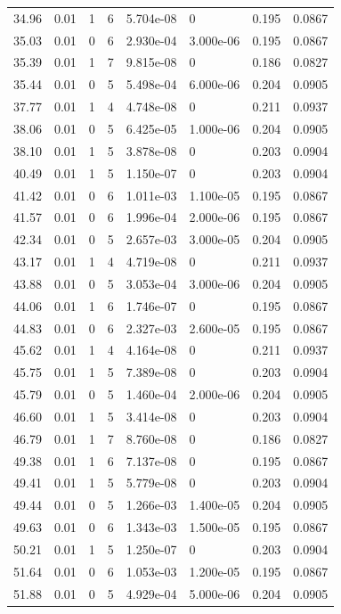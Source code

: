\documentclass[preview]{standalone}
\begin{document}
{{{\begin{tabular}{L{1.2cm}C{1.2cm} C{0.3cm}C{0.5cm} C{1.4cm}C{1.4cm} C{1.4cm}C{1.4cm}}
  34.96  &  0.01  & 1     &  6 &  5.704e-08  & 0  & 0.195 &  0.0867   \\ 
  35.03  &  0.01  & 0     &  6 &  2.930e-04  & 3.000e-06  & 0.195 &  0.0867   \\ 
  35.39  &  0.01  & 1     &  7 &  9.815e-08  & 0  & 0.186 &  0.0827   \\ 
  35.44  &  0.01  & 0     &  5 &  5.498e-04  & 6.000e-06  & 0.204 &  0.0905   \\ 
  37.77  &  0.01  & 1     &  4 &  4.748e-08  & 0  & 0.211 &  0.0937   \\ 
  38.06  &  0.01  & 0     &  5 &  6.425e-05  & 1.000e-06  & 0.204 &  0.0905   \\ 
  38.10  &  0.01  & 1     &  5 &  3.878e-08  & 0  & 0.203 &  0.0904   \\ 
  40.49  &  0.01  & 1     &  5 &  1.150e-07  & 0  & 0.203 &  0.0904   \\ 
  41.42  &  0.01  & 0     &  6 &  1.011e-03  & 1.100e-05  & 0.195 &  0.0867   \\ 
  41.57  &  0.01  & 0     &  6 &  1.996e-04  & 2.000e-06  & 0.195 &  0.0867   \\ 
  42.34  &  0.01  & 0     &  5 &  2.657e-03  & 3.000e-05  & 0.204 &  0.0905   \\ 
  43.17  &  0.01  & 1     &  4 &  4.719e-08  & 0  & 0.211 &  0.0937   \\ 
  43.88  &  0.01  & 0     &  5 &  3.053e-04  & 3.000e-06  & 0.204 &  0.0905   \\ 
  44.06  &  0.01  & 1     &  6 &  1.746e-07  & 0  & 0.195 &  0.0867   \\ 
  44.83  &  0.01  & 0     &  6 &  2.327e-03  & 2.600e-05  & 0.195 &  0.0867   \\ 
  45.62  &  0.01  & 1     &  4 &  4.164e-08  & 0  & 0.211 &  0.0937   \\ 
  45.75  &  0.01  & 1     &  5 &  7.389e-08  & 0  & 0.203 &  0.0904   \\ 
  45.79  &  0.01  & 0     &  5 &  1.460e-04  & 2.000e-06  & 0.204 &  0.0905   \\ 
  46.60  &  0.01  & 1     &  5 &  3.414e-08  & 0  & 0.203 &  0.0904   \\ 
  46.79  &  0.01  & 1     &  7 &  8.760e-08  & 0  & 0.186 &  0.0827   \\ 
  49.38  &  0.01  & 1     &  6 &  7.137e-08  & 0  & 0.195 &  0.0867   \\ 
  49.41  &  0.01  & 1     &  5 &  5.779e-08  & 0  & 0.203 &  0.0904   \\ 
  49.44  &  0.01  & 0     &  5 &  1.266e-03  & 1.400e-05  & 0.204 &  0.0905   \\ 
  49.63  &  0.01  & 0     &  6 &  1.343e-03  & 1.500e-05  & 0.195 &  0.0867   \\ 
  50.21  &  0.01  & 1     &  5 &  1.250e-07  & 0  & 0.203 &  0.0904   \\ 
  51.64  &  0.01  & 0     &  6 &  1.053e-03  & 1.200e-05  & 0.195 &  0.0867   \\ 
  51.88  &  0.01  & 0     &  5 &  4.929e-04  & 5.000e-06  & 0.204 &  0.0905   \\ 
\hline 
\end{tabular} 

}}}
\end{document}
